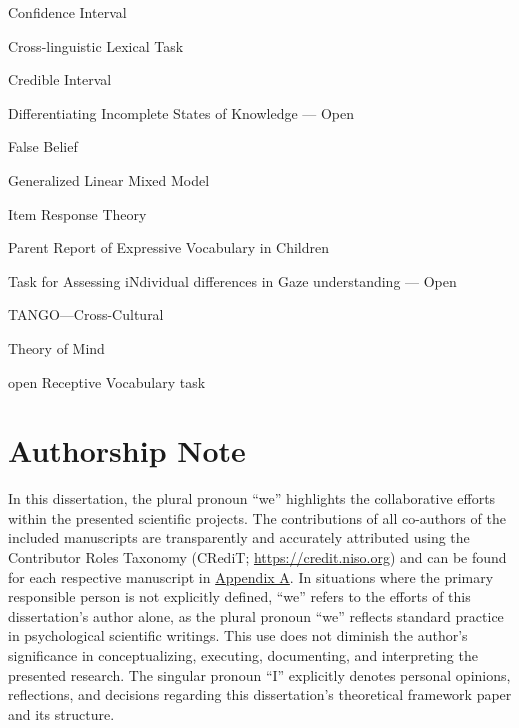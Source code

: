 \documentclass[
]{scrbook}
\providecommand{\tightlist}{%
  \setlength{\itemsep}{0pt}\setlength{\parskip}{0pt}}
\begin{document}
\begin{description}
\tightlist
\item[\phantomsection\label{acronyms_CI}{CI}]
Confidence Interval
\item[\phantomsection\label{acronyms_CLT}{CLT}]
Cross-linguistic Lexical Task
\item[\phantomsection\label{acronyms_CrI}{CrI}]
Credible Interval
\item[\phantomsection\label{acronyms_DISKO}{DISKO}]
Differentiating Incomplete States of Knowledge --- Open
\item[\phantomsection\label{acronyms_FB}{FB}]
False Belief
\item[\phantomsection\label{acronyms_GLMM}{GLMM}]
Generalized Linear Mixed Model
\item[\phantomsection\label{acronyms_IRT}{IRT}]
Item Response Theory
\item[\phantomsection\label{acronyms_PREVIC}{PREVIC}]
Parent Report of Expressive Vocabulary in Children
\item[\phantomsection\label{acronyms_TANGO}{TANGO}]
Task for Assessing iNdividual differences in Gaze understanding --- Open
\item[\phantomsection\label{acronyms_TANGOux2014CC}{TANGO---CC}]
TANGO---Cross-Cultural
\item[\phantomsection\label{acronyms_ToM}{ToM}]
Theory of Mind
\item[\phantomsection\label{acronyms_oREV}{oREV}]
open Receptive Vocabulary task
\end{description}

\chapter*{Authorship Note}\label{authorship}

In this dissertation, the plural pronoun ``we'' highlights the collaborative efforts within the presented scientific projects. The contributions of all co-authors of the included manuscripts are transparently and accurately attributed using the Contributor Roles Taxonomy (CRediT; \mbox{\url{https://credit.niso.org}}) and can be found for each respective manuscript in \hyperref[appendixA]{Appendix A}. In situations where the primary responsible person is not explicitly defined, ``we'' refers to the efforts of this dissertation's author alone, as the plural pronoun ``we'' reflects standard practice in psychological scientific writings. This use does not diminish the author's significance in conceptualizing, executing, documenting, and interpreting the presented research. The singular pronoun ``I'' explicitly denotes personal opinions, reflections, and decisions regarding this dissertation's theoretical framework paper and its structure.
\end{document}
